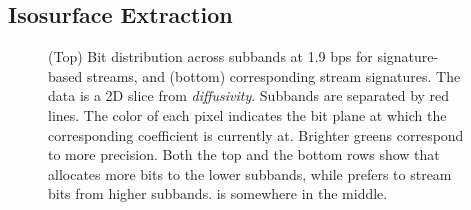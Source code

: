 \subsection{Isosurface Extraction}\label{sec:isocontour}


\begin{figure}[!b]
\vspace{-1em}
\centering
 \vspace{-0.5em}
\caption{(Top) Bit distribution across subbands at 1.9 bps for signature-based streams, and (bottom)
corresponding stream signatures. The data is a 2D slice from \emph{diffusivity}. Subbands are
separated by red lines. The color of each pixel indicates the bit plane at which the corresponding
coefficient is currently at. Brighter greens correspond to more precision. Both the top and the
bottom rows show that \shsg allocates more bits to the lower subbands, while \slsg prefers to stream
bits from higher subbands. \srsg is somewhere in the middle.}
\label{fig:bit-distrib}
\vspace{-1.5em}
\end{figure}


